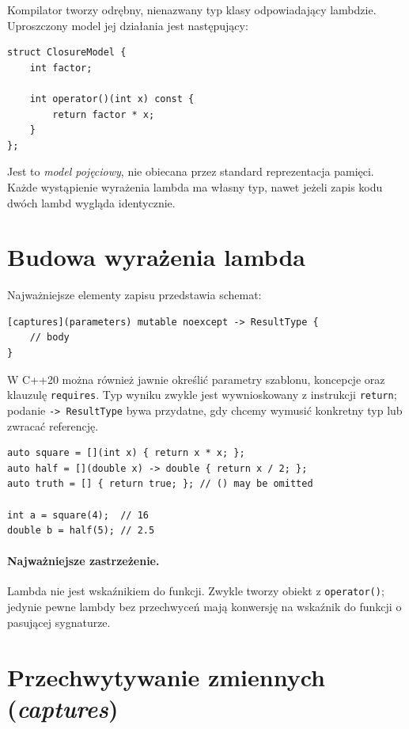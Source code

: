 Kompilator tworzy odrębny, nienazwany typ klasy odpowiadający lambdzie.
Uproszczony model jej działania jest następujący:

\begin{lstlisting}
struct ClosureModel {
    int factor;

    int operator()(int x) const {
        return factor * x;
    }
};
\end{lstlisting}

Jest to \emph{model pojęciowy}, nie obiecana przez standard reprezentacja
pamięci. Każde wystąpienie wyrażenia lambda ma własny typ, nawet jeżeli
zapis kodu dwóch lambd wygląda identycznie.

\section{Budowa wyrażenia lambda}
\label{sec:lambda-syntax}

Najważniejsze elementy zapisu przedstawia schemat:

\begin{lstlisting}
[captures](parameters) mutable noexcept -> ResultType {
    // body
}
\end{lstlisting}

W C++20 można również jawnie określić parametry szablonu, koncepcje
oraz klauzulę \texttt{requires}. Typ wyniku zwykle jest wywnioskowany
z instrukcji \texttt{return}; podanie \texttt{-> ResultType} bywa
przydatne, gdy chcemy wymusić konkretny typ lub zwracać referencję.

\begin{lstlisting}
auto square = [](int x) { return x * x; };
auto half = [](double x) -> double { return x / 2; };
auto truth = [] { return true; }; // () may be omitted

int a = square(4);  // 16
double b = half(5); // 2.5
\end{lstlisting}

\paragraph{Najważniejsze zastrzeżenie.}
Lambda nie jest wskaźnikiem do funkcji. Zwykle tworzy obiekt z
\texttt{operator()}; jedynie pewne lambdy bez przechwyceń mają
konwersję na wskaźnik do funkcji o pasującej sygnaturze.

\section{Przechwytywanie zmiennych (\textit{captures})}


